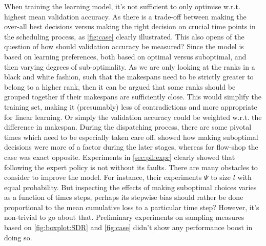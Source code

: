 \documentclass[smallextended]{svjour3}
\begin{document}
When training the learning model, it's not sufficient to only optimise w.r.t. 
highest mean validation accuracy. As there is a trade-off between making the 
over-all best decisions versus making the right decision on crucial time points 
in the scheduling process, as \cref{fig:case} clearly illustrated. 
This also opens of the question of how should validation accuracy be measured? 
Since the model is based on learning preferences, both based on optimal versus 
suboptimal, and then varying degrees of sub-optimality. As we are only looking 
at the ranks in a black and white fashion, such that the makespans need to be 
strictly greater to belong to a higher rank, then it can be argued that some 
ranks should be grouped together if their makespans are sufficiently close. 
This would simplify the training set, making it (presumably) less of 
contradictions and more appropriate for linear learning. Or simply the 
validation accuracy could be weighted w.r.t. the  difference in 
makespan.
During the dispatching process, there are some pivotal times which need to be 
especially taken care off.  showed how making suboptimal 
decisions were more of a factor during the later stages, whereas for flow-shop 
the case was exact opposite. 
Experiments in \cref{sec:pil:expr} clearly showed that following the expert 
policy is not without its faults. There are many obstacles to consider to 
improve the model. 
For instance, their experiments $\Psi$ to size $l$ with equal 
probability. But inspecting the effects of making suboptimal choices varies as 
a function of times steps, perhaps its stepwise bias should rather be done 
proportional to the mean cumulative loss to a particular time step? 
However, it's non-trivial to go about that. Preliminary experiments on sampling 
measures based on \cref{fig:boxplot:SDR} and \cref{fig:case} didn't show any 
performance boost in doing so.
\end{document}
